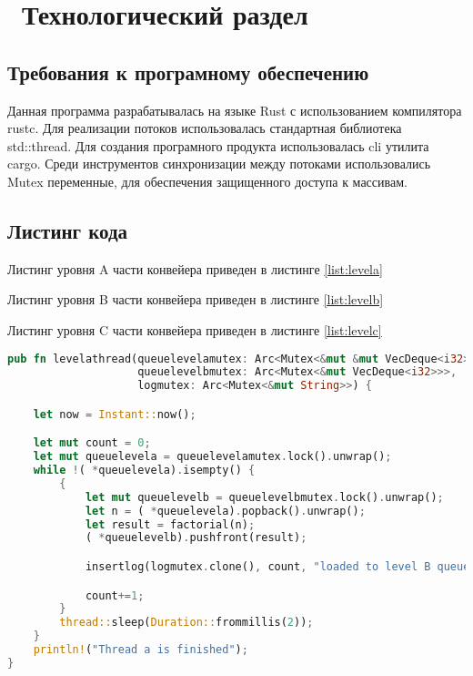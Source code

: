 \chapter{ Технологический раздел}
\section{ Требования к програмному обеспечению}
Данная программа разрабатывалась на языке Rust с использованием компилятора rustc. Для реализации потоков использовалась стандартная библиотека std::thread. Для создания програмного продукта использовалась cli утилита cargo. Среди инструментов синхронизации между потоками использовались Mutex переменные, для обеспечения защищенного доступа к массивам.

\section{ Листинг кода}

Листинг уровня A части конвейера приведен в листинге \ref{list:levela}

Листинг уровня B части конвейера приведен в листинге \ref{list:levelb}

Листинг уровня C части конвейера приведен в листинге \ref{list:levelc}

\begin{lstlisting}[language=Rust, caption={ Реализация уровня A конвейера.},
                    label={list:levela}]
pub fn levelathread(queuelevelamutex: Arc<Mutex<&mut &mut VecDeque<i32>>>, 
                    queuelevelbmutex: Arc<Mutex<&mut VecDeque<i32>>>,
                    logmutex: Arc<Mutex<&mut String>>) {

    let now = Instant::now();

    let mut count = 0;
    let mut queuelevela = queuelevelamutex.lock().unwrap();
    while !( *queuelevela).isempty() {
        {
            let mut queuelevelb = queuelevelbmutex.lock().unwrap();
            let n = ( *queuelevela).popback().unwrap();
            let result = factorial(n);
            ( *queuelevelb).pushfront(result);

            insertlog(logmutex.clone(), count, "loaded to level B queue", now.elapsed());

            count+=1;
        }
        thread::sleep(Duration::frommillis(2));
    }
    println!("Thread a is finished");
}
\end{lstlisting}

